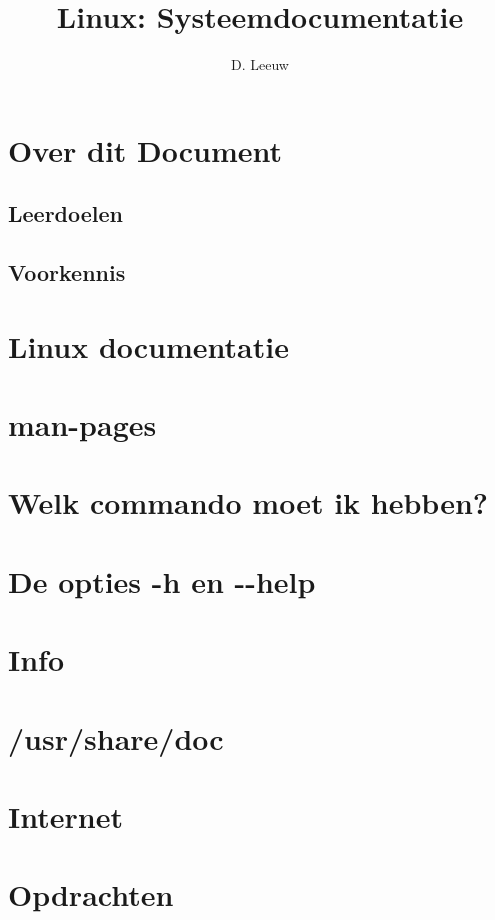 \documentclass[a4paper,12pt,twoside,openright,titlepage]{article}
\author{D. Leeuw}
\title{Linux: Systeemdocumentatie}
\date{\today\\
\vfill
\raggedright
\copyright\ 2020-2025 Dennis Leeuw\\
}
\begin{document}

\maketitle


\section{Over dit Document}
\subsection{Leerdoelen}

\subsection{Voorkennis}



\section{Linux documentatie}

\section{man-pages}

\section{Welk commando moet ik hebben?}

\section{De opties -h en -{}-help}

\section{Info}

\section{/usr/share/doc}

\section{Internet}

\section{Opdrachten}


\printindex

\end{document}
